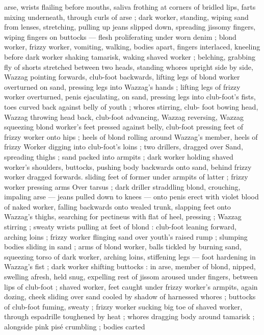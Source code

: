 arse, wrists flailing before mouths, saliva frothing at corners of
bridled lips, farts mixing underneath, through curls of arse ; dark
worker, standing, wiping sand from lenses, stretching, pulling up
jeans slipped down, spreading jissomy fingers, wiping fingers on
buttocks --- flesh proliferating under worn denim ; blond worker,
frizzy worker, vomiting, walking, bodies apart, fingers interlaced,
kneeling before dark worker shaking tamarisk, waking shaved worker
; belching, grabbing fly of shorts stretched between two heads,
standing whores upright side by side, Wazzag pointing forwards,
club-foot backwards, lifting legs of blond worker overturned on
sand, pressing legs into Wazzag's hands ; lifting legs of frizzy worker
overturned, penis ejaculating, on sand, pressing legs into club-foot's
fists, toes curved back against belly of youth ; whores stirring, club-
foot bowing head, Wazzag throwing head back, club-foot advancing,
Wazzag reversing, Wazzag squeezing blond worker's feet pressed
against belly, club-foot pressing feet of frizzy worker onto hips ;
heels of blond rolling around Wazzag's member, heels of frizzy
Worker digging into club-foot's loins ; two drillers, dragged over
Sand, spreading thighs ; sand packed into armpits ; dark worker
holding shaved worker's shoulders, buttocks, pushing body
backwards onto sand, behind frizzy worker dragged forwards. sliding
feet of former under armpits of latter ; frizzy worker pressing arms
Over tarsus ; dark driller straddling blond, crouching, impaling arse
--- jeans pulled down to knees --- onto penis erect with violet blood
of naked worker, falling backwards onto wealed trunk, slapping feet
onto Wazzag's thighs, searching for pectineus with flat of heel,
pressing ; Wazzag stirring ; sweaty wrists pulling at feet of blond :
club-foot leaning forward, arching loins ; frizzy worker flinging sand
over youth's raised rump ; slumping bodies sliding in sand ; arms of
blond worker, balls tickled by burning sand, squeezing torso of dark
worker, arching loins, stiffening legs --- foot hardening in Wazzag's
fist ; dark worker shifting buttocks : in arse, member of blond,
nipped, swelling afresh, held snug, expelling rest of jissom aroused
under fingers, between lips of club-foot ; shaved worker, feet caught
under frizzy worker's armpits, again dozing, cheek sliding over sand
cooled by shadow of harnessed whores ; buttocks of club-foot
fuming, sweaty ; frizzy worker sucking big toe of shaved worker,
through espadrille toughened by heat ; whores dragging body
around tamarisk ; alongside pink pisé crumbling ; bodies carted
